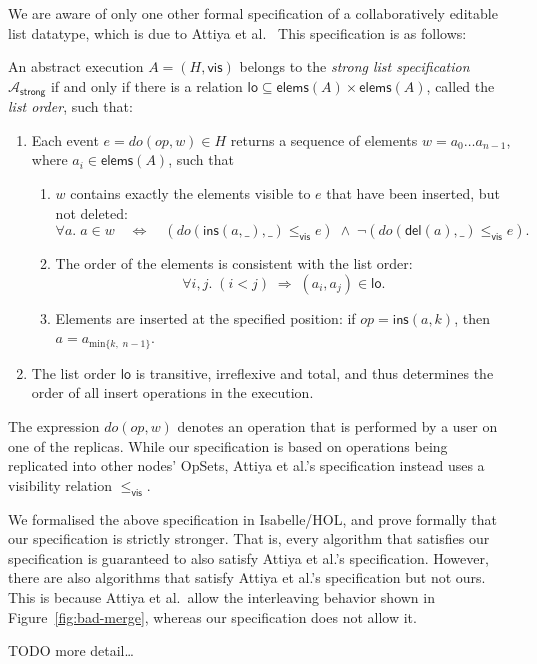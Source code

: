 We are aware of only one other formal specification of a collaboratively editable list datatype, which is due to Attiya et al.~\cite{Attiya:2016kh}
This specification is as follows:
\begin{displayquote}
An abstract execution $A = (H, \textsf{vis})$ belongs to the \emph{strong list specification} $\mathcal{A}_\textsf{strong}$ if and only if there is a relation $\textsf{lo} \subseteq \textsf{elems}(A) \times \textsf{elems}(A)$, called the \emph{list order}, such that:
\begin{enumerate}
\item Each event $e = \mathit{do}(\mathit{op}, w) \in H$ returns a sequence of elements $w=a_0 \dots a_{n-1}$, where $a_i \in \textsf{elems}(A)$, such that
\begin{enumerate}
\item $w$ contains exactly the elements visible to $e$ that have been inserted, but not deleted:
\[ \forall a.\; a \in w \quad\Longleftrightarrow\quad (\mathit{do}(\textsf{ins}(a, \_), \_) \le_\textsf{vis} e)
\;\wedge\; \neg(\mathit{do}(\textsf{del}(a), \_) \le_\textsf{vis} e). \]
\item The order of the elements is consistent with the list order:
\[ \forall i, j.\; (i < j) \;\Longrightarrow\; (a_i, a_j) \in \textsf{lo}. \]
\item Elements are inserted at the specified position:
if $\mathit{op} = \textsf{ins}(a, k)$, then $a = a_{\mathrm{min} \{k,\; n-1\}}$.
\end{enumerate}
\item The list order $\textsf{lo}$ is transitive, irreflexive and total, and thus determines the order of all insert operations in the execution.
\end{enumerate}
\end{displayquote}

The expression $\mathit{do}(\mathit{op}, w)$ denotes an operation that is performed by a user on one of the replicas.
While our specification is based on operations being replicated into other nodes' OpSets, Attiya et al.'s specification instead uses a visibility relation $\le_\textsf{vis}$.

We formalised the above specification in Isabelle/HOL, and prove formally that our specification is strictly stronger.
That is, every algorithm that satisfies our specification is guaranteed to also satisfy Attiya et al.'s specification.
However, there are also algorithms that satisfy Attiya et al.'s specification but not ours.
This is because Attiya et al.\ allow the interleaving behavior shown in Figure~\ref{fig:bad-merge}, whereas our specification does not allow it.

TODO more detail\dots
